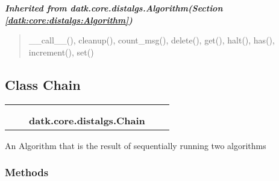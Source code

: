 \large{\textbf{\textit{Inherited from datk.core.distalgs.Algorithm\textit{(Section \ref{datk:core:distalgs:Algorithm})}}}}

\begin{quote}
\_\_call\_\_(), cleanup(), count\_msg(), delete(), get(), halt(), has(), increment(), set()
\end{quote}


\subsection{Class Chain}

    \label{datk:core:distalgs:Chain}
\begin{tabular}{cccccc}
\multicolumn{2}{r}{\settowidth{\BCL}{datk.core.distalgs.Algorithm}\multirow{2}{\BCL}{datk.core.distalgs.Algorithm}}
&&
  \\\cline{3-3}
  &&\multicolumn{1}{c|}{}
&&
  \\
&&\multicolumn{2}{l}{\textbf{datk.core.distalgs.Chain}}
\end{tabular}

An Algorithm that is the result of sequentially running two algorithms



  \subsubsection{Methods}

    \vspace{0.5ex}

